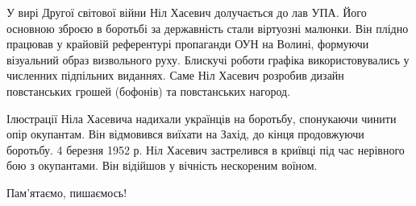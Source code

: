 У вирі Другої світової війни Ніл Хасевич долучається до лав УПА. Його основною
зброєю в боротьбі за державність стали віртуозні малюнки. Він плідно працював у
крайовій референтурі пропаганди ОУН на Волині, формуючи візуальний образ
визвольного руху. Блискучі роботи графіка використовувались у численних
підпільних виданнях. Саме Ніл Хасевич розробив дизайн повстанських грошей
(бофонів) та повстанських нагород.

Ілюстрації Ніла Хасевича надихали українців на боротьбу, спонукаючи чинити опір
окупантам. Він відмовився виїхати на Захід, до кінця продовжуючи боротьбу. 4
березня 1952 р. Ніл Хасевич застрелився в криївці під час нерівного бою з
окупантами. Він відійшов у вічність нескореним воїном.

Пам’ятаємо, пишаємось!
